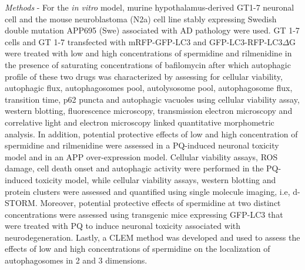 \textit{Methods} - For the \textit{in vitro} model, murine hypothalamus-derived GT1-7 neuronal cell and the mouse neuroblastoma (N2a) cell line stably expressing Swedish  double mutation APP695 (Swe) associated with AD pathology were used. GT 1-7 cells and GT 1-7 transfected with mRFP-GFP-LC3 and GFP-LC3-RFP-LC3$\Delta$G were treated with low and high concentrations of spermidine and rilmenidine in the presence of saturating concentrations of bafilomycin after which autophagic profile of these two drugs was characterized by assessing for cellular viability, autophagic flux, autophagosomes pool, autolysosome pool, autophagosome flux, transition time, p62 puncta and autophagic vacuoles using cellular viability assay, western blotting, fluorescence microscopy, transmission electron microscopy and correlative light and electron microscopy linked quantitative morphometric analysis. In addition, potential protective effects of low and high concentration of  spermidine and rilmenidine were assessed in a PQ-induced neuronal toxicity model and in an APP over-expression model. Cellular viability assays, ROS damage, cell death onset and autophagic activity were performed in the PQ-induced toxicity model, while cellular viability assays, western blotting and protein clusters were assessed and quantified using single molecule imaging, i.e, d-STORM. Moreover, potential protective effects of spermidine at two distinct concentrations were assessed using transgenic mice expressing GFP-LC3 that were treated with PQ to induce neuronal toxicity associated with neurodegeneration. Lastly, a CLEM method was developed and used to assess the effects of low and high concentrations of spermidine on the localization of autophagosomes in 2 and 3 dimensions. 

